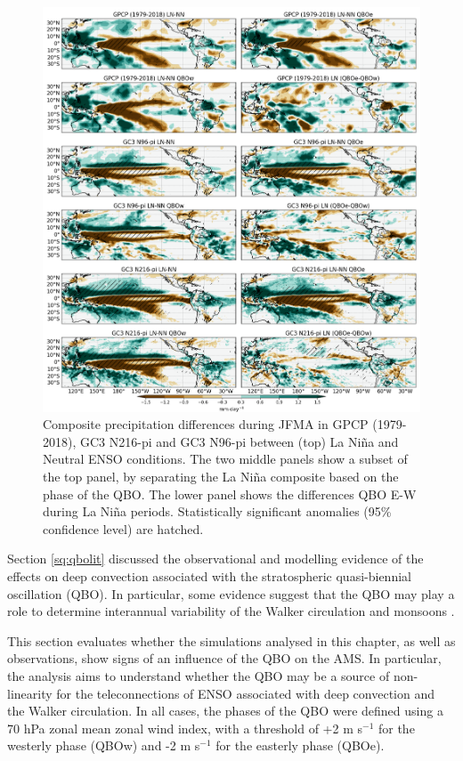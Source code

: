 \begin{figure}[b!]
\includegraphics[width=\linewidth]{figures/trops_qbolnprfma}
\caption[Precipitation anomalies as a function of QBO and ENSO phases]{Composite precipitation differences during JFMA in GPCP (1979-2018), GC3 N216-pi and GC3 N96-pi between (top) La Niña and Neutral ENSO conditions. The two middle panels show a subset of the top panel, by separating the La Niña composite based on the phase of the QBO. The lower panel shows the differences QBO E-W during La Niña periods. Statistically significant anomalies (95\% confidence level) are hatched.}
\label{fig:qbopr_pis}
\end{figure}  

Section \ref{sq:qbolit} discussed the observational and modelling evidence of the effects on deep convection associated with the stratospheric quasi-biennial oscillation (QBO). In particular, some evidence suggest that the QBO may play a role to determine interannual variability of the Walker circulation and monsoons \citep{giorgetta1999,collimore2003,liess2012}. 

This section evaluates whether the simulations analysed in this chapter, as well as observations, show signs of an influence of the QBO on the AMS. 
In particular, the analysis aims to understand whether the QBO may be a source of non-linearity for the teleconnections of ENSO associated with deep convection and the Walker circulation. In all cases, the phases of the QBO were defined using a 70 hPa zonal mean zonal wind index, with a threshold of +2 m s$^{-1}$ for the westerly phase (QBOw) and -2 m s$^{-1}$ for the easterly phase (QBOe).

